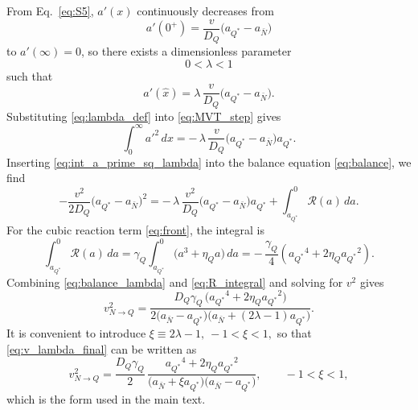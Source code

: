 \documentclass[10pt,superscriptaddress,
amsmath,aps,prl,twocolumn,nofootinbib]{revtex4-1}
\newcommand{\aQstar}{\ensuremath{a_{Q^*}}}
\newcommand{\Nbar}{{\ensuremath{\bar N}}}
\begin{document}
From Eq.~\eqref{eq:S5}, $a'(x)$ continuously decreases from
\begin{equation}
    a'(0^+) = \frac{v}{D_Q}\bigl(\aQstar-a_\Nbar\bigr)
\end{equation}
to $a'(\infty)=0$, so there exists a dimensionless parameter
\begin{equation}
    0<\lambda<1
\end{equation}
such that
\begin{equation}
    a'(\hat{x})=\lambda\,\frac{v}{D_Q}\bigl(\aQstar-a_\Nbar\bigr).
    \label{eq:lambda_def}
\end{equation}
Substituting \eqref{eq:lambda_def} into \eqref{eq:MVT_step} gives
\begin{equation}
    \int_{0}^{\infty} a'^2\,dx
    = -\,\lambda\,\frac{v}{D_Q}\bigl(\aQstar-a_\Nbar\bigr) \aQstar.
    \label{eq:int_a_prime_sq_lambda}
\end{equation}
Inserting \eqref{eq:int_a_prime_sq_lambda} into the balance equation
\eqref{eq:balance}, we find
\begin{equation}
    -\frac{v^2}{2D_Q}\bigl(\aQstar-a_\Nbar\bigr)^2
    = -\,\lambda\,\frac{v^2}{D_Q}\bigl(\aQstar-a_\Nbar\bigr)\aQstar
      +\int^{0}_{\aQstar}\mathcal{R}(a)\,da.
    \label{eq:balance_lambda}
\end{equation}
For the cubic reaction term \eqref{eq:front}, the integral is
\begin{equation}
    \int^{0}_{\aQstar}\mathcal{R}(a)\,da
    = \gamma_Q\int_{\aQstar}^{0}\bigl(a^3+\eta_Q a\bigr)\,da
    = -\,\frac{\gamma_Q}{4}\left(\aQstar^4+2\eta_Q \aQstar^2\right).
    \label{eq:R_integral}
\end{equation}
Combining \eqref{eq:balance_lambda} and \eqref{eq:R_integral} and solving for $v^2$
gives
\begin{equation}
    v_{N\to Q}^2
    = \frac{D_Q\gamma_Q\,\bigl(\aQstar^4+2\eta_Q\aQstar^2\bigr)}
           {2\bigl(a_\Nbar-\aQstar\bigr)\bigl(a_\Nbar+(2\lambda-1)\aQstar\bigr)}.
    \label{eq:v_lambda_final}
\end{equation}
It is convenient to introduce $\xi \equiv 2\lambda-1, \ -1<\xi<1,$ so that \eqref{eq:v_lambda_final} can be written as
\begin{equation}
    v_{N\to Q}^2
    = \frac{D_Q\gamma_Q}{2}\,
      \frac{\aQstar^4+2\eta_Q \aQstar^2}
           {\bigl(a_\Nbar+\xi \aQstar\bigr)\bigl(a_\Nbar-\aQstar\bigr)},
    \qquad -1<\xi<1,
    \label{eq:v_xi_final}
\end{equation}
which is the form used in the main text.


\end{document}
